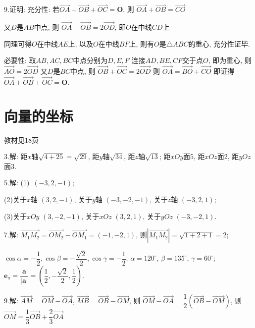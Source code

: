   9.证明:  充分性: 若$\overrightarrow {OA} + \overrightarrow {OB} + \overrightarrow {OC} = \bm{O}$, 则
  $\overrightarrow {OA}  + \overrightarrow {OB} = \overrightarrow {CO}$

  又$D$是$AB$中点, 则
  $\overrightarrow {OA}  + \overrightarrow {OB} = 2 \overrightarrow {OD}$,
  即$O$在中线$CD$上

  同理可得$O$在中线$AE$上, 以及$O$在中线$BF$上,
  则有$O$是$\triangle ABC$的重心, 充分性证毕.

   必要性: 取$AB, AC, BC$中点分别为$D,E, F$
  连接$AD, BE, CF$交于点$O$, 即为重心, 则
  $\overrightarrow {AO}  =  2 \overrightarrow {OD}$
  又$D$是$BC$中点, 则
  $\overrightarrow {OB}  + \overrightarrow {OC} = 2 \overrightarrow {OD}$
  则
  $\overrightarrow {OA} = \overrightarrow {BO}  + \overrightarrow {CO}$
  即证得$\overrightarrow {OA} + \overrightarrow {OB} + \overrightarrow {OC} = \bm{O}$.

\section{向量的坐标}
\begin{flushright}
  \color{zhanqing!80}
   教材见18页
\end{flushright}

  3.解: 距$x$轴$\sqrt {4 + 25}  = \sqrt {29}$, 距$y$轴$\sqrt {34}$, 距$z$轴$\sqrt {13}$;
  距$xOy$面5, 距$xOz$面2, 距$yOz$面3.

  5.解: (1)~$(-3,2,-1)$;

  (2)关于$x$轴 $(3,2,-1)$,   关于$y$轴 $(-3,-2,-1)$, 关于$z$轴 $(-3,2,1)$;

  (3)关于$xOy$ $(3,-2,-1)$, 关于$xOz$ $(3,2,1)$, 关于$yOz$ $(-3,-2,1)$.

  7.解: $\overrightarrow{M_1M_2}= \overrightarrow {OM_2}  - \overrightarrow {OM_1}  = ( -1,-2,1)$,
  则$\left| {\overrightarrow {M_1M_2} } \right| = \sqrt {1 + 2 + 1}  = 2$;

  $\cos \alpha = -\dfrac{1}{2}, \cos \beta = - \dfrac{{\sqrt 2 }}{2}, \cos \gamma  = - \dfrac{1}{2}$; \quad
  $\alpha  = 120^\circ$, $\beta  = 135^\circ$, $\gamma  = 60^\circ$; \quad
  $\bm{e}_a=\dfrac{\bm{a}}{\left| {\bm{a}} \right|} = (\dfrac{1}{2}, - \dfrac{\sqrt {2}}{2},\dfrac{1}{2})$.

  9.解: $\overrightarrow {AM}  = \overrightarrow {OM}  - \overrightarrow {OA}$, $\overrightarrow {MB}  = \overrightarrow {OB}  - \overrightarrow {OM}$, 则  $\overrightarrow {OM}  - \overrightarrow {OA}  = \dfrac{1}{2} \left(\overrightarrow {OB}  - \overrightarrow {OM} \right)$,
  则
  $\overrightarrow {OM}  = \dfrac{1}{3} \overrightarrow {OB}  + \dfrac{2}{3} \overrightarrow {OA} $

